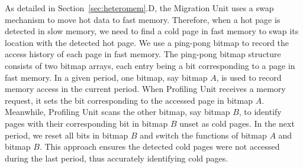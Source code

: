 As detailed in Section~\ref{sec:heteromem}.D, the Migration Unit uses a swap mechanism to move hot data to fast memory. 
Therefore, when a hot page is detected in slow memory, we need to find a cold page in fast memory to swap its location with the detected hot page. We use a ping-pong bitmap to record the access history of each page in fast memory. The ping-pong bitmap structure consists of two bitmap arrays, each entry being a bit corresponding to a page in fast memory.
In a given period, one bitmap, say bitmap $A$, is used to record memory access in the current period. When Profiling Unit receives a memory request, it sets the bit corresponding to the accessed page in bitmap $A$. Meanwhile, Profiling Unit scans the other bitmap, say bitmap $B$, to identify pages with their corresponding bit in bitmap $B$ unset as cold pages. In the next period, we reset all bits in bitmap $B$ and switch the functions of bitmap $A$ and bitmap $B$. 
This approach ensures the detected cold pages were not accessed during the last period, thus accurately identifying cold pages.


